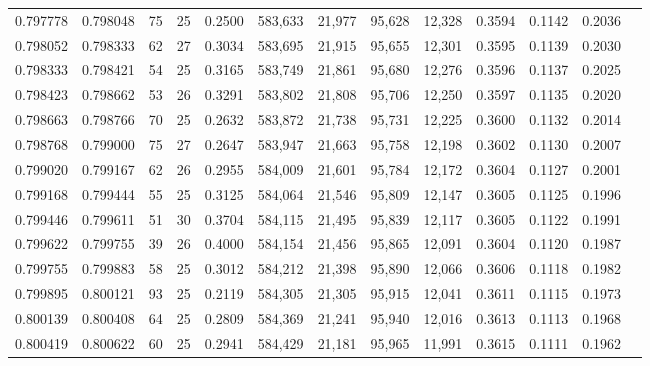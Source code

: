 \begin{tabular}{rrrrrrrrrrrrr}
0.797778 & 0.798048 &    75 &  25 &                                     0.2500 & 583,633 &  21,977 &  95,628 &  12,328 & 0.3594 & 0.1142 & 0.2036 \\
0.798052 & 0.798333 &    62 &  27 &                                     0.3034 & 583,695 &  21,915 &  95,655 &  12,301 & 0.3595 & 0.1139 & 0.2030 \\
0.798333 & 0.798421 &    54 &  25 &                                     0.3165 & 583,749 &  21,861 &  95,680 &  12,276 & 0.3596 & 0.1137 & 0.2025 \\
0.798423 & 0.798662 &    53 &  26 &                                     0.3291 & 583,802 &  21,808 &  95,706 &  12,250 & 0.3597 & 0.1135 & 0.2020 \\
0.798663 & 0.798766 &    70 &  25 &                                     0.2632 & 583,872 &  21,738 &  95,731 &  12,225 & 0.3600 & 0.1132 & 0.2014 \\
0.798768 & 0.799000 &    75 &  27 &                                     0.2647 & 583,947 &  21,663 &  95,758 &  12,198 & 0.3602 & 0.1130 & 0.2007 \\
0.799020 & 0.799167 &    62 &  26 &                                     0.2955 & 584,009 &  21,601 &  95,784 &  12,172 & 0.3604 & 0.1127 & 0.2001 \\
0.799168 & 0.799444 &    55 &  25 &                                     0.3125 & 584,064 &  21,546 &  95,809 &  12,147 & 0.3605 & 0.1125 & 0.1996 \\
0.799446 & 0.799611 &    51 &  30 &                                     0.3704 & 584,115 &  21,495 &  95,839 &  12,117 & 0.3605 & 0.1122 & 0.1991 \\
0.799622 & 0.799755 &    39 &  26 &                                     0.4000 & 584,154 &  21,456 &  95,865 &  12,091 & 0.3604 & 0.1120 & 0.1987 \\
0.799755 & 0.799883 &    58 &  25 &                                     0.3012 & 584,212 &  21,398 &  95,890 &  12,066 & 0.3606 & 0.1118 & 0.1982 \\
0.799895 & 0.800121 &    93 &  25 &                                     0.2119 & 584,305 &  21,305 &  95,915 &  12,041 & 0.3611 & 0.1115 & 0.1973 \\
0.800139 & 0.800408 &    64 &  25 &                                     0.2809 & 584,369 &  21,241 &  95,940 &  12,016 & 0.3613 & 0.1113 & 0.1968 \\
0.800419 & 0.800622 &    60 &  25 &                                     0.2941 & 584,429 &  21,181 &  95,965 &  11,991 & 0.3615 & 0.1111 & 0.1962 \\

\end{tabular}
